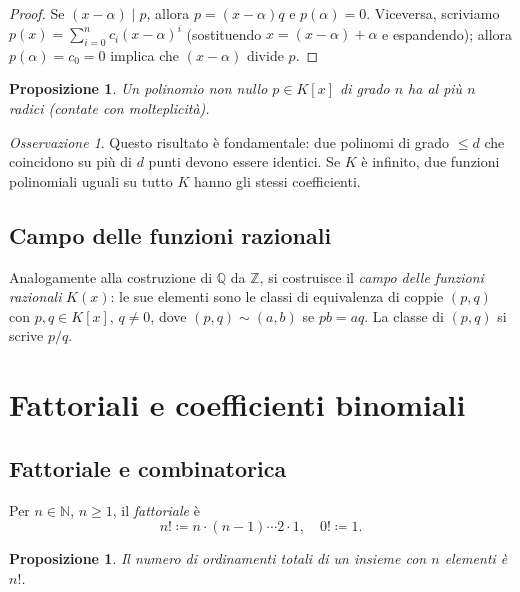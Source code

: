\documentclass[11pt, a4paper]{book}
\theoremstyle{definition}
\theoremstyle{plain}
\newtheorem{proposizione}[definizione]{Proposizione}
\theoremstyle{remark}
\newtheorem{osservazione}[definizione]{Osservazione}
\newcommand{\N}{\mathbb{N}}
\newcommand{\Z}{\mathbb{Z}}
\newcommand{\Q}{\mathbb{Q}}
\begin{document}
\begin{proof}
Se $(x-\alpha) \mid p$, allora $p = (x-\alpha)q$ e $p(\alpha) = 0$. Viceversa, scriviamo $p(x) = \sum_{i=0}^n c_i (x-\alpha)^i$ (sostituendo $x = (x-\alpha)+\alpha$ e espandendo); allora $p(\alpha) = c_0 = 0$ implica che $(x-\alpha)$ divide $p$.
\end{proof}

\begin{proposizione}
Un polinomio non nullo $p \in K[x]$ di grado $n$ ha al più $n$ radici (contate con molteplicità).
\end{proposizione}

\begin{osservazione}
Questo risultato è fondamentale: due polinomi di grado $\leq d$ che coincidono su più di $d$ punti devono essere identici. Se $K$ è infinito, due funzioni polinomiali uguali su tutto $K$ hanno gli stessi coefficienti.
\end{osservazione}

\subsection{Campo delle funzioni razionali}

Analogamente alla costruzione di $\Q$ da $\Z$, si costruisce il \emph{campo delle funzioni razionali} $K(x)$: le sue elementi sono le classi di equivalenza di coppie $(p, q)$ con $p, q \in K[x]$, $q \neq 0$, dove $(p, q) \sim (a, b)$ se $pb = aq$. La classe di $(p,q)$ si scrive $p/q$.

\section{Fattoriali e coefficienti binomiali}

\subsection{Fattoriale e combinatorica}

Per $n \in \N$, $n \geq 1$, il \emph{fattoriale} è
\[
  n! \coloneqq n \cdot (n-1) \cdots 2 \cdot 1, \quad 0! \coloneqq 1.
\]

\begin{proposizione}
Il numero di ordinamenti totali di un insieme con $n$ elementi è $n!$.
\end{proposizione}
\end{document}
